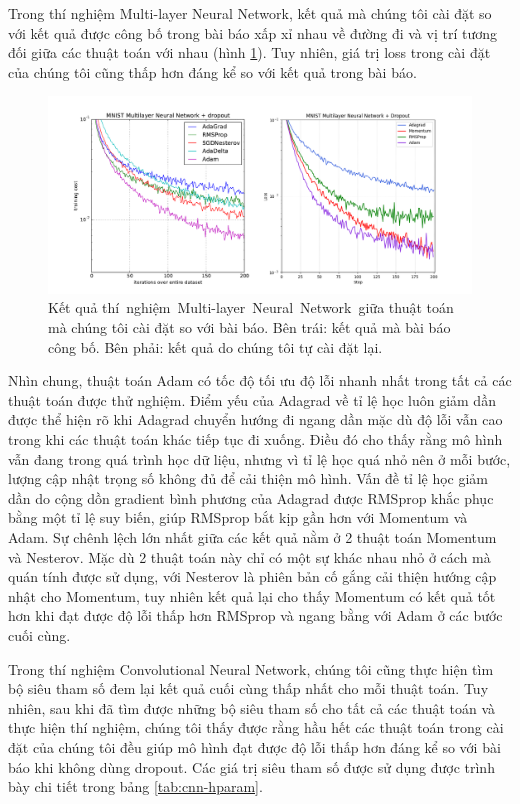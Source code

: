 Trong thí nghiệm Multi-layer Neural Network, kết quả mà chúng tôi cài đặt so với kết quả được công bố trong bài báo xấp xỉ nhau về đường đi và vị trí tương đối giữa các thuật toán với nhau (hình \ref{fig:exp-mlp}). Tuy nhiên, giá trị loss trong cài đặt của chúng tôi cũng thấp hơn đáng kể so với kết quả trong bài báo.

\begin{figure}[htp]
	\centering
	\includegraphics[width=140 mm]{images/mlp.png}
	\caption{Kết quả thí nghiệm Multi-layer Neural Network giữa thuật toán mà chúng tôi cài đặt so với bài báo. Bên trái: kết quả mà bài báo công bố. Bên phải: kết quả do chúng tôi tự cài đặt lại.}
	\label{fig:exp-mlp}
\end{figure}

Nhìn chung, thuật toán Adam có tốc độ tối ưu độ lỗi nhanh nhất trong tất cả các thuật toán được thử nghiệm. Điểm yếu của Adagrad về tỉ lệ học luôn giảm dần được thể hiện rõ khi Adagrad chuyển hướng đi ngang dần mặc dù độ lỗi vẫn cao trong khi các thuật toán khác tiếp tục đi xuống. Điều đó cho thấy rằng mô hình vẫn đang trong quá trình học dữ liệu, nhưng vì tỉ lệ học quá nhỏ nên ở mỗi bước, lượng cập nhật trọng số không đủ để cải thiện mô hình. Vấn đề tỉ lệ học giảm dần do cộng dồn gradient bình phương của Adagrad được RMSprop khắc phục bằng một tỉ lệ suy biến, giúp RMSprop bắt kịp gần hơn với Momentum và Adam. Sự chênh lệch lớn nhất giữa các kết quả nằm ở 2 thuật toán Momentum và Nesterov. Mặc dù 2 thuật toán này chỉ có một sự khác nhau nhỏ ở cách mà quán tính được sử dụng, với Nesterov là phiên bản cố gắng cải thiện hướng cập nhật cho Momentum, tuy nhiên kết quả lại cho thấy Momentum có kết quả tốt hơn khi đạt được độ lỗi thấp hơn RMSprop và ngang bằng với Adam ở các bước cuối cùng.

Trong thí nghiệm Convolutional Neural Network, chúng tôi cũng thực hiện tìm bộ siêu tham số đem lại kết quả cuối cùng thấp nhất cho mỗi thuật toán. Tuy nhiên, sau khi đã tìm được những bộ siêu tham số cho tất cả các thuật toán và thực hiện thí nghiệm, chúng tôi thấy được rằng hầu hết các thuật toán trong cài đặt của chúng tôi đều giúp mô hình đạt được độ lỗi thấp hơn đáng kể so với bài báo khi không dùng dropout. Các giá trị siêu tham số được sử dụng được trình bày chi tiết trong bảng \ref{tab:cnn-hparam}.

